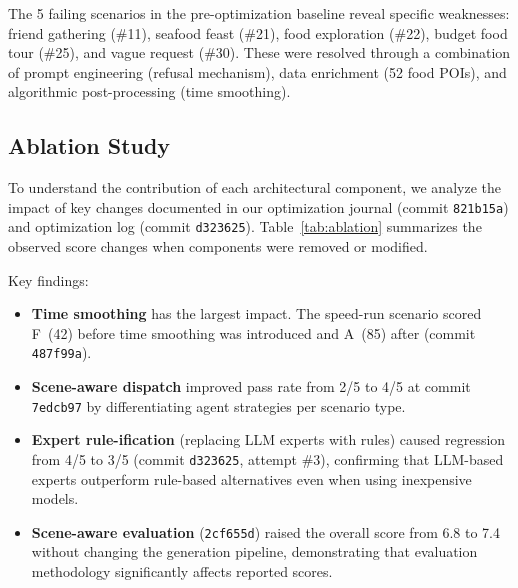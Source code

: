 The 5 failing scenarios in the pre-optimization baseline reveal specific weaknesses: friend gathering (\#11), seafood feast (\#21), food exploration (\#22), budget food tour (\#25), and vague request (\#30). These were resolved through a combination of prompt engineering (refusal mechanism), data enrichment (52 food POIs), and algorithmic post-processing (time smoothing).

\subsection{Ablation Study}

To understand the contribution of each architectural component, we analyze the impact of key changes documented in our optimization journal (commit \texttt{821b15a}) and optimization log (commit \texttt{d323625}). Table~\ref{tab:ablation} summarizes the observed score changes when components were removed or modified.

\begin{table}[!t]
\centering
\caption{Ablation analysis derived from optimization history. Each row corresponds to a documented change.}
\label{tab:ablation}
\end{table}

Key findings:
\begin{itemize}[leftmargin=*]
    \item \textbf{Time smoothing} has the largest impact. The speed-run scenario scored F~(42) before time smoothing was introduced and A~(85) after (commit \texttt{487f99a}).
    \item \textbf{Scene-aware dispatch} improved pass rate from 2/5 to 4/5 at commit \texttt{7edcb97} by differentiating agent strategies per scenario type.
    \item \textbf{Expert rule-ification} (replacing LLM experts with rules) caused regression from 4/5 to 3/5 (commit \texttt{d323625}, attempt \#3), confirming that LLM-based experts outperform rule-based alternatives even when using inexpensive models.
    \item \textbf{Scene-aware evaluation} (\texttt{2cf655d}) raised the overall score from 6.8 to 7.4 without changing the generation pipeline, demonstrating that evaluation methodology significantly affects reported scores.
\end{itemize}

